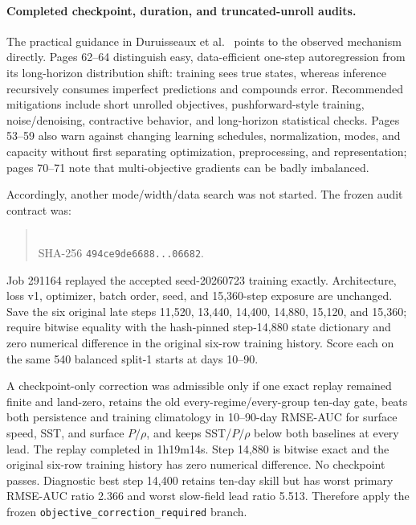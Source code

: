 \documentclass[11pt]{article}
\begin{document}
\paragraph{Completed checkpoint, duration, and truncated-unroll audits.}
The practical guidance in Duruisseaux et al.\ \cite{Duruisseaux2026} points to the
observed mechanism directly.  Pages 62--64 distinguish easy, data-efficient one-step
autoregression from its long-horizon distribution shift: training sees true states,
whereas inference recursively consumes imperfect predictions and compounds error.
Recommended mitigations include short unrolled objectives, pushforward-style training,
noise/denoising, contractive behavior, and long-horizon statistical checks.  Pages
53--59 also warn against changing learning schedules, normalization, modes, and
capacity without first separating optimization, preprocessing, and representation;
pages 70--71 note that multi-objective gradients can be badly imbalanced.

Accordingly, another mode/width/data search was not started.  The frozen audit
contract was:
\begin{quote}
\\
SHA-256 \texttt{494ce9de6688...06682}.
\end{quote}
Job 291164 replayed the accepted seed-20260723 training exactly.  Architecture, loss v1,
optimizer, batch order, seed, and 15,360-step exposure are unchanged.  Save the six original late steps
11,520, 13,440, 14,400, 14,880, 15,120, and 15,360; require bitwise equality with the
hash-pinned step-14,880 state dictionary and zero numerical difference in the original
six-row training history.  Score each on the same 540 balanced split-1 starts at days
10--90.

A checkpoint-only correction was admissible only if one exact replay remained finite
and land-zero, retains the old every-regime/every-group ten-day gate, beats both
persistence and training climatology in 10--90-day RMSE-AUC for surface speed, SST,
and surface \(P/\rho\), and keeps SST/\(P/\rho\) below both baselines at every lead.
The replay completed in 1h19m14s.  Step 14,880 is bitwise exact and the original
six-row training history has zero numerical difference.  No checkpoint passes.
Diagnostic best step 14,400 retains ten-day skill but has worst primary RMSE-AUC
ratio 2.366 and worst slow-field lead ratio 5.513.  Therefore apply the frozen
\texttt{objective\_correction\_required} branch.
\end{document}
